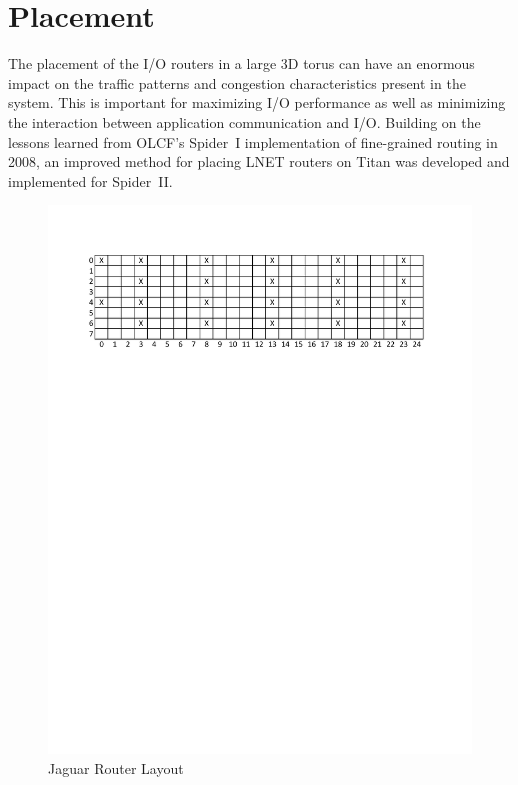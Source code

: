 \section{Placement}

The placement of the I/O routers in a large 3D torus can have an enormous impact
on the traffic patterns and congestion characteristics present in the system.
This is important for maximizing I/O performance as well as minimizing the
interaction between application communication and I/O. Building on the lessons
learned from OLCF's Spider~I implementation of fine-grained routing in 2008, an
improved method for placing LNET routers on Titan was developed and implemented
for Spider~II.

\begin{figure}[t]
  \begin{center}
    \includegraphics{figures/jaguarplacement}
    \caption{Jaguar Router Layout}\label{fig:jaglayout}
  \end{center}
\end{figure}

